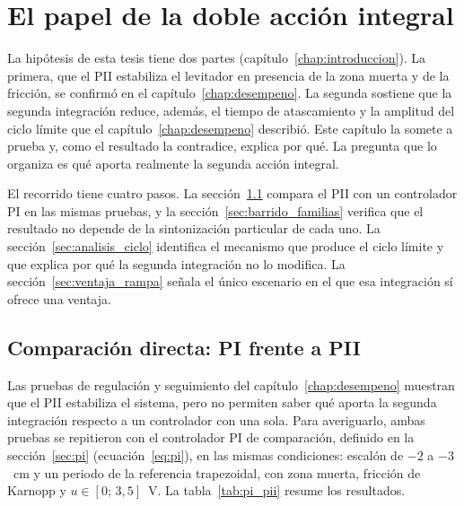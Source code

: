 \chapter{El papel de la doble acción integral}\label{chap:doble_integral}

La hipótesis de esta tesis tiene dos partes (capítulo~\ref{chap:introduccion}). La primera, que el PII estabiliza el levitador en presencia de la zona muerta y de la fricción, se confirmó en el capítulo~\ref{chap:desempeno}. La segunda sostiene que la segunda integración reduce, además, el tiempo de atascamiento y la amplitud del ciclo límite que el capítulo~\ref{chap:desempeno} describió. Este capítulo la somete a prueba y, como el resultado la contradice, explica por qué. La pregunta que lo organiza es qué aporta realmente la segunda acción integral.

El recorrido tiene cuatro pasos. La sección~\ref{sec:pi_pii} compara el PII con un controlador PI en las mismas pruebas, y la sección~\ref{sec:barrido_familias} verifica que el resultado no depende de la sintonización particular de cada uno. La sección~\ref{sec:analisis_ciclo} identifica el mecanismo que produce el ciclo límite y que explica por qué la segunda integración no lo modifica. La sección~\ref{sec:ventaja_rampa} señala el único escenario en el que esa integración sí ofrece una ventaja.

\section{Comparación directa: PI frente a PII}\label{sec:pi_pii}

Las pruebas de regulación y seguimiento del capítulo~\ref{chap:desempeno} muestran que el PII estabiliza el sistema, pero no permiten saber qué aporta la segunda integración respecto a un controlador con una sola. Para averiguarlo, ambas pruebas se repitieron con el controlador PI de comparación, definido en la sección~\ref{sec:pi} (ecuación~\eqref{eq:pi}), en las mismas condiciones: escalón de $-2$ a $-3$~cm y un periodo de la referencia trapezoidal, con zona muerta, fricción de Karnopp y $u\in[0;\,3{,}5]$~V. La tabla~\ref{tab:pi_pii} resume los resultados.

